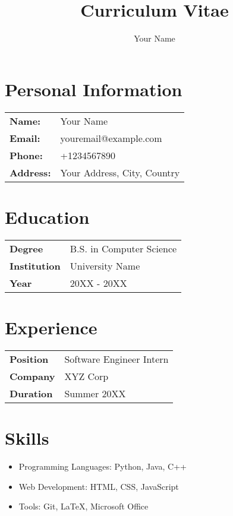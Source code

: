 \documentclass{article}
\title{Curriculum Vitae}
\author{Your Name}
\begin{document}
\maketitle

\section*{Personal Information}
\begin{tabular}{p{} p{}}
    \textbf{Name:} & Your Name \\
    \textbf{Email:} & youremail@example.com \\
    \textbf{Phone:} & +1234567890 \\
    \textbf{Address:} & Your Address, City, Country \\
\end{tabular}

\section*{Education}
\begin{tabular}{p{} p{}}
    \textbf{Degree} & B.S. in Computer Science \\
    \textbf{Institution} & University Name \\
    \textbf{Year} & 20XX - 20XX \\
\end{tabular}

\section*{Experience}
\begin{tabular}{p{} p{}}
    \textbf{Position} & Software Engineer Intern \\
    \textbf{Company} & XYZ Corp \\
    \textbf{Duration} & Summer 20XX \\
\end{tabular}

\section*{Skills}
\begin{itemize}[label=$\bullet$, leftmargin=*]
    \item Programming Languages: Python, Java, C++
    \item Web Development: HTML, CSS, JavaScript
    \item Tools: Git, LaTeX, Microsoft Office
\end{itemize}
\end{document}
